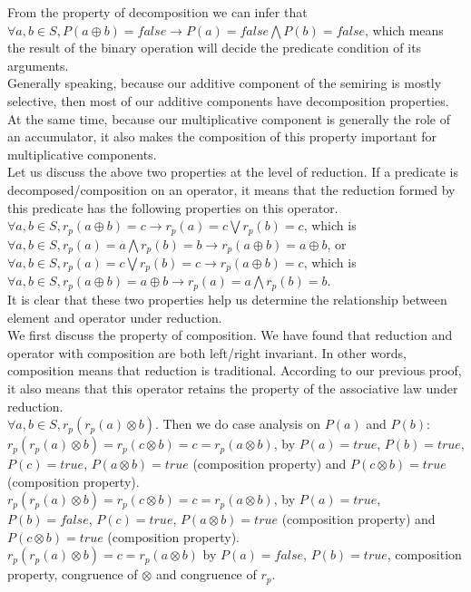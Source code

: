 \documentclass[a4paper,10pt]{article}
\begin{document}
From the property of decomposition we can infer that $\forall a,b \in S, P(a \oplus b)= false \rightarrow P(a) = false \bigwedge P (b) = false$, which means the result of the binary operation will decide the predicate condition of its arguments.\\
Generally speaking, because our additive component of the semiring is mostly selective, then most of our additive components have decomposition properties. At the same time, because our multiplicative component is generally the role of an accumulator, it also makes the composition of this property important for multiplicative components.\\
Let us discuss the above two properties at the level of reduction. If a predicate is decomposed/composition on an operator, it means that the reduction formed by this predicate has the following properties on this operator.\\
$\forall a,b \in S, r_p(a\oplus b) = c \rightarrow r_p(a) = c \bigvee r_p (b) = c$, which is 
$\forall a,b \in S, r_p(a) = a \bigwedge r_p (b) = b \rightarrow r_p(a \oplus b)= a \oplus b$, or\\
$\forall a,b \in S, r_p(a) = c \bigvee r_p (b) = c \rightarrow r_p(a \oplus b)= c$, which is 
$\forall a,b \in S, r_p(a\oplus b) = a \oplus b \rightarrow r_p(a) = a \bigwedge r_p (b) = b$.\\
It is clear that these two properties help us determine the relationship between element and operator under reduction.\\
We first discuss the property of composition. 
We have found that reduction and operator with composition are both left/right invariant.
In other words, composition means that reduction is traditional. According to our previous proof, it also means that this operator retains the property of the associative law under reduction.\\
$\forall a,b \in S, r_p(r_p(a) \otimes b)$. Then we do case analysis on $P(a)$ and $P(b)$:\\
$r_p(r_p(a) \otimes b) = r_p(c \otimes b) = c = r_p(a \otimes b)$, by $P(a) = true$, $P(b) = true$, $P(c) = true$, $P(a \otimes b) = true$ (composition property) and $P(c \otimes b) = true$ (composition property).\\
$r_p(r_p(a) \otimes b) = r_p(c \otimes b) = c = r_p(a \otimes b)$, by $P(a) = true$, $P(b) = false$, $P(c) = true$, $P(a \otimes b) = true$ (composition property) and $P(c \otimes b) = true$ (composition property).\\
$r_p(r_p(a) \otimes b) = c = r_p(a \otimes b)$ by $P(a) = false$, $P(b) = true$, composition property, congruence of $\otimes$ and congruence of $r_p$.\\
\end{document}
